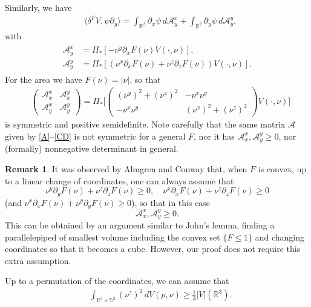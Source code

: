 \documentclass[11pt,a4paper]{amsart}
\newcommand{\R}{\mathbb{R}}
\newcommand{\de}{\partial}
\newcommand{\ang}[1]{\langle#1\rangle}
\theoremstyle{definition}
\newtheorem{rmk}[definition]{Remark}
\newcommand{\A}{\mathcal{A}}
\begin{document}
Similarly, we have
\begin{align*}
	&\ang{\delta^F V,\psi \de_y}=\int_{\R^2} \de_x \psi\,d\A_y^x+\int_{\R^2}\de_y \psi\,d\A_y^y,
\end{align*}
with
\begin{align}\label{CD}
\begin{aligned}
	\A_y^x&=\Pi_*[-\nu^y\de_xF(\nu)V(\cdot,\nu)], \\
	\A_y^y&=\Pi_*[(\nu^x\de_xF(\nu)+\nu^z\de_zF(\nu))V(\cdot,\nu)].
\end{aligned}
\end{align}
For the area we have $F(\nu)=|\nu|$, so that
\begin{align}\label{ABCD.area}
	&\begin{pmatrix}\A_x^x & \A_x^y \\ \A_y^x & \A_y^y\end{pmatrix}
	=\Pi_*\Bigg[\begin{pmatrix}(\nu^y)^2+(\nu^z)^2 & -\nu^x\nu^y \\ -\nu^x\nu^y & (\nu^x)^2+(\nu^z)^2\end{pmatrix}V(\cdot,\nu)\Bigg]
\end{align}
is symmetric and positive semidefinite. Note carefully that the same matrix $\A$ given by \cref{A}--\cref{CD} is not symmetric for a general $F$, nor it has
$\A_x^x,\A_y^y\ge0$, nor (formally) nonnegative determinant in general.

\begin{rmk}
It was observed by Almgren and Conway that, when $F$ is convex, up to a linear change of coordinates,
one can always assume that
$$\nu^y\de_yF(\nu)+\nu^z\de_zF(\nu)\ge0,\quad\nu^x\de_xF(\nu)+\nu^z\de_zF(\nu)\ge0$$
(and $\nu^x\de_xF(\nu)+\nu^y\de_yF(\nu)\ge0$), so that in this case
$$\A_x^x,\A_y^y\ge0.$$
This can be obtained by an argument similar to John's lemma,
finding a parallelepiped of smallest volume including the convex set $\{F\le1\}$
and changing coordinates so that it becomes a cube.
However, our proof does not require this extra assumption.
\end{rmk}

Up to a permutation of the coordinates, we can assume that
\begin{align}\label{one.third}
	&\int_{\R^3\times \mathbb{S}^2} (\nu^z)^2\,dV(p,\nu)\ge\frac{1}{3}|V|(\R^3).
\end{align}
\end{document}
